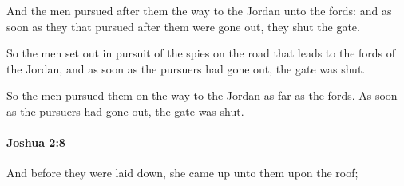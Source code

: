 			\begin{versebox}
					\item[BHS] 
					\item[ASV] And the men pursued after them the way to the Jordan unto the fords: and as soon as they that pursued after them were gone out, they shut the gate.
					\item[NIV] So the men set out in pursuit of the spies on the road that leads to the fords of the Jordan, and as soon as the pursuers had gone out, the gate was shut.
					\item[NRSV] So the men pursued them on the way to the Jordan as far as the fords. As soon as the pursuers had gone out, the gate was shut.
			\end{versebox}

		\paragraph{Joshua 2:8} %
			\label{JOSHUA-2-8}

			And before they were laid down, she came up unto them upon the roof;

